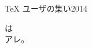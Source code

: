 \documentclass[a6paper,papersize,uplatex]{jsarticle}
\begin{document}
\begin{center}\LARGE
{\TeX} ユーザの集い2014
\par\smallskip
{}
\par\smallskip
は\\{\gtfamily アレ。}
\end{center}
\end{document}
